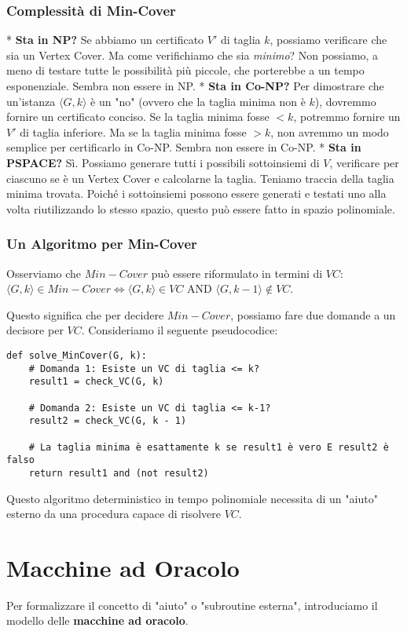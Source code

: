 \documentclass[a4paper]{article}
\begin{document}
\subsubsection{Complessità di Min-Cover}
*   \textbf{Sta in NP?} Se abbiamo un certificato $V'$ di taglia $k$, possiamo verificare che sia un Vertex Cover. Ma come verifichiamo che sia \emph{minimo}? Non possiamo, a meno di testare tutte le possibilità più piccole, che porterebbe a un tempo esponenziale. Sembra non essere in NP.
*   \textbf{Sta in Co-NP?} Per dimostrare che un'istanza $\langle G,k \rangle$ è un "no" (ovvero che la taglia minima non è $k$), dovremmo fornire un certificato conciso. Se la taglia minima fosse $< k$, potremmo fornire un $V'$ di taglia inferiore. Ma se la taglia minima fosse $> k$, non avremmo un modo semplice per certificarlo in Co-NP. Sembra non essere in Co-NP.
*   \textbf{Sta in PSPACE?} Sì. Possiamo generare tutti i possibili sottoinsiemi di $V$, verificare per ciascuno se è un Vertex Cover e calcolarne la taglia. Teniamo traccia della taglia minima trovata. Poiché i sottoinsiemi possono essere generati e testati uno alla volta riutilizzando lo stesso spazio, questo può essere fatto in spazio polinomiale.

\subsubsection{Un Algoritmo per Min-Cover}
Osserviamo che $Min-Cover$ può essere riformulato in termini di $VC$:
$\langle G, k \rangle \in Min-Cover \iff \langle G, k \rangle \in VC \text{ AND } \langle G, k-1 \rangle \notin VC$.

Questo significa che per decidere $Min-Cover$, possiamo fare due domande a un decisore per $VC$.
Consideriamo il seguente pseudocodice:
\begin{verbatim}
def solve_MinCover(G, k):
    # Domanda 1: Esiste un VC di taglia <= k?
    result1 = check_VC(G, k)

    # Domanda 2: Esiste un VC di taglia <= k-1?
    result2 = check_VC(G, k - 1)

    # La taglia minima è esattamente k se result1 è vero E result2 è falso
    return result1 and (not result2)
\end{verbatim}
Questo algoritmo deterministico in tempo polinomiale necessita di un "aiuto" esterno da una procedura capace di risolvere $VC$.

\section{Macchine ad Oracolo}
Per formalizzare il concetto di "aiuto" o "subroutine esterna", introduciamo il modello delle \textbf{macchine ad oracolo}.
\end{document}
